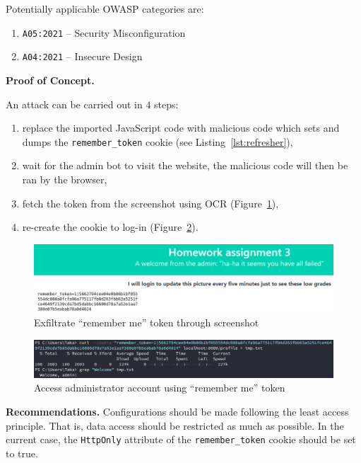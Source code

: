 \documentclass[parskip=half]{scrartcl}
\newcommand{\figref}[1]{Figure~\ref{#1}}
\begin{document}
Potentially applicable OWASP categories are:
\begin{enumerate}
    \item \texttt{A05:2021} -- Security Misconfiguration
    \item \texttt{A04:2021} -- Insecure Design
\end{enumerate}

\textbf{Proof of Concept.}

An attack can be carried out in $4$ steps:
\begin{enumerate}
    \item replace the imported JavaScript code with malicious
    code which sets and dumps the \texttt{remember\_token} cookie
    (see Listing~\ref{lst:refresher}),
    \item wait for the admin bot to visit the website, the malicious code will
    then be ran by the browser,
    \item fetch the token from the screenshot using OCR
    (\figref{fig:tokendisplay}),
    \item re-create the cookie to log-in (\figref{fig:remhijack}).
\end{enumerate}

\begin{figure}[h]
    \centering
    \includegraphics[width=\textwidth]{token_display}
    \caption{Exfiltrate ``remember me'' token through screenshot}
    \label{fig:tokendisplay}
\end{figure}

\begin{figure}[h]
    \centering
    \includegraphics[width=\textwidth]{remember_hijack}
    \caption{Access administrator account using ``remember me'' token}
    \label{fig:remhijack}
\end{figure}

\textbf{Recommendations.} Configurations should be made following the least
access principle. That is, data access should be restricted as much as
possible. In the current case, the \texttt{HttpOnly} attribute of the
\texttt{remember\_token} cookie should be set to true.
\end{document}

